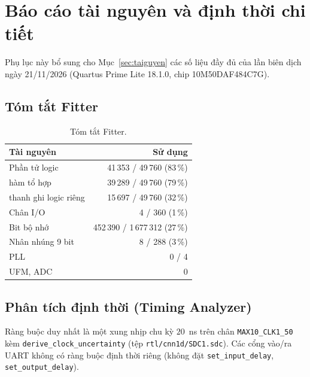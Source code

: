 \chapter{Báo cáo tài nguyên và định thời chi tiết}\label{pl:taiguyen}
Phụ lục này bổ sung cho Mục~\ref{sec:taiguyen} các số liệu đầy đủ của lần biên dịch ngày 21/11/2026 (Quartus Prime Lite 18.1.0, chip 10M50DAF484C7G).

\section*{Tóm tắt Fitter}
\begin{table}[H]\centering
\caption{Tóm tắt Fitter.}\label{tab:pl-fit}
\small
\begin{tabular}{@{}lr@{}}
\toprule
Tài nguyên & Sử dụng \\ \midrule
Phần tử logic & 41\,353 / 49\,760 (83\,\%) \\
\quad hàm tổ hợp & 39\,289 / 49\,760 (79\,\%) \\
\quad thanh ghi logic riêng & 15\,697 / 49\,760 (32\,\%) \\
Chân I/O & 4 / 360 (1\,\%) \\
Bit bộ nhớ & 452\,390 / 1\,677\,312 (27\,\%) \\
Nhân nhúng 9 bit & 8 / 288 (3\,\%) \\
PLL & 0 / 4 \\
UFM, ADC & 0 \\ \bottomrule
\end{tabular}
\end{table}

\section*{Phân tích định thời (Timing Analyzer)}
Ràng buộc duy nhất là một xung nhịp chu kỳ $20$~ns trên chân \texttt{MAX10\_CLK1\_50} kèm \texttt{derive\_clock\_uncertainty} (tệp \texttt{rtl/cnn1d/SDC1.sdc}).
Các cổng vào/ra UART không có ràng buộc định thời riêng (không đặt \texttt{set\_input\_delay}, \texttt{set\_output\_delay}).

